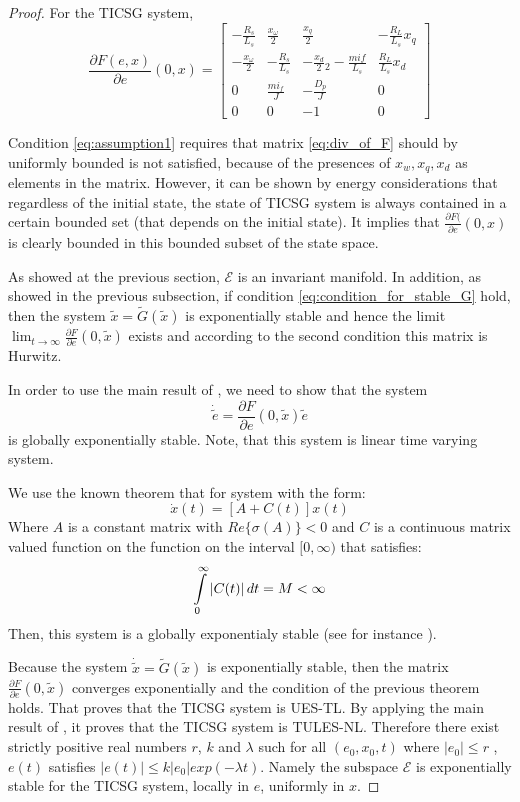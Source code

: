 \documentclass[letterpaper, 10 pt, conference]{ieeeconf}  %
\begin{document}
\begin{proof}
For the TICSG system, 
\begin{equation}
\frac{\partial F(e,x)}{\partial e}(0,x)=\left[\begin{array}{cccc}
-\frac{R_{s}}{L_{s}} & \frac{x_{\omega}}{2} & \frac{x_{q}}{2} & -\frac{R_{L}}{L_{s}}x_{q}\\
-\frac{x_{\omega}}{2} & -\frac{R_{s}}{L_{s}} & -\frac{x_{d}}{2}{}_{2}-\frac{mif}{L_{s}} & \frac{R_{L}}{L_{s}}x_{d}\\
0 & \frac{mi_{f}}{J} & -\frac{D_{p}}{J} & 0\\
0 & 0 & -1 & 0
\end{array}\right]\label{eq:div_of_F}
\end{equation}

Condition \eqref{eq:assumption1} requires that matrix \eqref{eq:div_of_F} should by uniformly bounded is not satisfied, because of the presences of $x_{w},x_{q},x_{d}$ as elements in the matrix. However, it can be shown by energy considerations  that regardless
of the initial state, the state of TICSG system is always contained in a certain bounded set (that depends on the initial state).
It implies that $\frac{\partial F(}{\partial e}(0,x)$ is clearly bounded in this bounded subset of the state space.

As showed at the previous section, $\mathscr{E}$ is an invariant manifold. In addition, as showed in the previous subsection, if  condition \eqref{eq:condition_for_stable_G} hold, then the system $
\tilde{x}=\tilde{G}(\tilde{x})$ is exponentially stable and hence the limit $\lim_{t \to \infty}\frac{\partial F}{\partial e}(0,\tilde{x})$ exists and according to the second condition this matrix is Hurwitz.

In order to use the main result of \cite{AndrieuJayawardhanaPraly}, we need to show that the system  
$$
\dot{\tilde{e}}=\frac{\partial F}{\partial e}(0,\tilde{x})\tilde{e}
$$
is globally exponentially stable. Note, that this system is linear time varying system.

We use the known theorem that for system with the form: 
$$
\dot{x}(t)=[A+C(t)]x(t)
$$
Where $A$ is a constant matrix with $Re\{\sigma(A)\}<0$ and  $C$
is a continuous matrix valued function on the function on the interval
$[0,\infty)$ that satisfies: 
\[
\intop_{0}^{\infty}\left|C(t)\right|dt=M<\infty
\]
Then, this system is a globally exponentialy stable (see for instance \cite{SchovanecGilliam1999}).

Because the system $\dot{\tilde{x}}=\tilde{G}(\tilde{x})$ is exponentially stable, then the matrix $\frac{\partial F}{\partial e}(0,\tilde{x})$ converges exponentially and the condition of the previous theorem holds.  That proves that the TICSG system is UES-TL. By applying
the main result of \cite{AndrieuJayawardhanaPraly}, it proves that the TICSG system is TULES-NL.
Therefore there exist strictly positive real numbers $r$, $k$
and $\lambda$ such for all $(e_0,x_0,t)$ where $\left| e_0 \right| \le r $
, $e(t)$ satisfies $\left|e(t)\right|\leq k\left|e_0 \right|exp(-\lambda t)$.
Namely the subspace $\mathscr{E}$ is exponentially stable for the TICSG system, locally in $e$, uniformly in $x$.
\end{proof}
\end{document}
